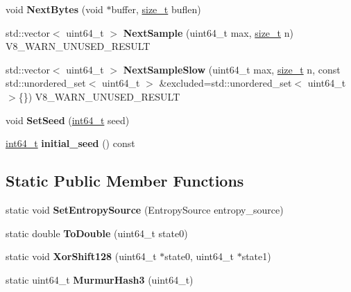 \begin{DoxyCompactItemize}
void {\bfseries Next\+Bytes} (void $\ast$buffer, \mbox{\hyperlink{classsize__t}{size\+\_\+t}} buflen)
\item 
\mbox{\label{classv8_1_1base_1_1RandomNumberGenerator_a4090ec844e0f1cc4150db68cf69c6c7d}} 
std\+::vector$<$ uint64\+\_\+t $>$ {\bfseries Next\+Sample} (uint64\+\_\+t max, \mbox{\hyperlink{classsize__t}{size\+\_\+t}} n) V8\+\_\+\+W\+A\+R\+N\+\_\+\+U\+N\+U\+S\+E\+D\+\_\+\+R\+E\+S\+U\+LT
\item 
\mbox{\label{classv8_1_1base_1_1RandomNumberGenerator_a8da70065401acffe63d0be29e5a20596}} 
std\+::vector$<$ uint64\+\_\+t $>$ {\bfseries Next\+Sample\+Slow} (uint64\+\_\+t max, \mbox{\hyperlink{classsize__t}{size\+\_\+t}} n, const std\+::unordered\+\_\+set$<$ uint64\+\_\+t $>$ \&excluded=std\+::unordered\+\_\+set$<$ uint64\+\_\+t $>$\{\}) V8\+\_\+\+W\+A\+R\+N\+\_\+\+U\+N\+U\+S\+E\+D\+\_\+\+R\+E\+S\+U\+LT
\item 
\mbox{\label{classv8_1_1base_1_1RandomNumberGenerator_a09f96e1c329a56aa6c62b21c2d97d188}} 
void {\bfseries Set\+Seed} (\mbox{\hyperlink{classint64__t}{int64\+\_\+t}} seed)
\item 
\mbox{\label{classv8_1_1base_1_1RandomNumberGenerator_ab2032751e720a66ae16e9bf81cc63f8f}} 
\mbox{\hyperlink{classint64__t}{int64\+\_\+t}} {\bfseries initial\+\_\+seed} () const
\end{DoxyCompactItemize}
\subsection*{Static Public Member Functions}
\begin{DoxyCompactItemize}
\item 
\mbox{\label{classv8_1_1base_1_1RandomNumberGenerator_ae97b331c6a33123e8571f93aaeaea164}} 
static void {\bfseries Set\+Entropy\+Source} (Entropy\+Source entropy\+\_\+source)
\item 
\mbox{\label{classv8_1_1base_1_1RandomNumberGenerator_a654429611ff0993d6ef6a337c6943158}} 
static double {\bfseries To\+Double} (uint64\+\_\+t state0)
\item 
\mbox{\label{classv8_1_1base_1_1RandomNumberGenerator_aed81ac9a466d6f8c981f13909574b1cf}} 
static void {\bfseries Xor\+Shift128} (uint64\+\_\+t $\ast$state0, uint64\+\_\+t $\ast$state1)
\item 
\mbox{\label{classv8_1_1base_1_1RandomNumberGenerator_ac780ac819aabd925ed250e66dc00a6b8}} 
static uint64\+\_\+t {\bfseries Murmur\+Hash3} (uint64\+\_\+t)
\end{DoxyCompactItemize}


